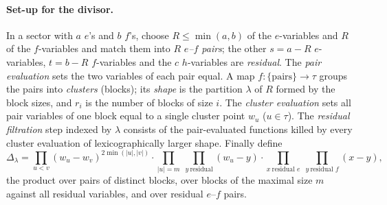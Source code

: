\paragraph{Set-up for the divisor.} In a sector with $a$ $e$'s and $b$ $f$'s, choose $R\le\min(a,b)$ of the
$e$-variables and $R$ of the $f$-variables and match them into $R$ \emph{$e$--$f$ pairs}; the other $s=a-R$
$e$-variables, $t=b-R$ $f$-variables and the $c$ $h$-variables are \emph{residual}. The \emph{pair evaluation}
sets the two variables of each pair equal. A map $f\colon\{\text{pairs}\}\to\tau$ groups the pairs into
\emph{clusters} (blocks); its \emph{shape} is the partition $\lambda$ of $R$ formed by the block sizes, and $r_i$ is
the number of blocks of size $i$. The \emph{cluster evaluation} sets all pair variables of one block equal to a
single cluster point $w_u$ ($u\in\tau$). The \emph{residual filtration} step indexed by $\lambda$ consists of the
pair-evaluated functions killed by every cluster evaluation of lexicographically larger shape. Finally define
\begin{equation}\label{l20:eq:Delta}
\Delta_\lambda=\prod_{u<v}(w_u-w_v)^{2\min(|u|,|v|)}\cdot\prod_{|u|=m}\ \prod_{y\ \text{residual}}(w_u-y)
\cdot\prod_{x\ \text{residual }e}\ \prod_{y\ \text{residual }f}(x-y),
\end{equation}
the product over pairs of distinct blocks, over blocks of the maximal size $m$ against all residual variables,
and over residual $e$--$f$ pairs.

